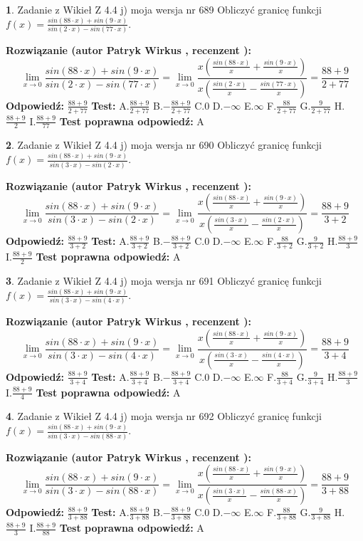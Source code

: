 \documentclass[12pt, a4paper]{article}
\theoremstyle{definition} %
\newtheorem{zad}{}
\newcommand{\zadStart}[1]{\begin{zad}#1\newline}
\newcommand{\zadStop}{\end{zad}}
\newcommand{\rozwStart}[2]{\noindent \textbf{Rozwiązanie (autor #1 , recenzent #2): }\newline}
\newcommand{\rozwStop}{\newline}
\newcommand{\odpStart}{\noindent \textbf{Odpowiedź:}\newline}
\newcommand{\odpStop}{\newline}
\newcommand{\testStart}{\noindent \textbf{Test:}\newline}
\newcommand{\testStop}{\newline}
\newcommand{\kluczStart}{\noindent \textbf{Test poprawna odpowiedź:}\newline}
\newcommand{\kluczStop}{\newline}
\begin{document}
\zadStart{Zadanie z Wikieł Z 4.4 j) moja wersja nr 689}
Obliczyć granicę funkcji $f(x)=\frac{sin(88\cdot x) +sin(9\cdot x)}{sin(2\cdot x) -sin(77\cdot x)}$.
\zadStop
\rozwStart{Patryk Wirkus}{}
$$\lim\limits_{x\to 0}\frac{sin(88\cdot x) +sin(9\cdot x)}{sin(2\cdot x) -sin(77\cdot x)}=\lim\limits_{x\to 0}\frac{x(\frac{sin(88\cdot x)}{x}+\frac{sin(9\cdot x)}{x})}{x(\frac{sin(2\cdot x)}{x}-\frac{sin(77\cdot x)}{x})}=\frac{88+9}{2+77}$$
\rozwStop
\odpStart
$\frac{88+9}{2+77}$
\odpStop
\testStart
A.$\frac{88+9}{2+77}$
B.$-\frac{88+9}{2+77}$
C.$0$
D.$-\infty$
E.$\infty$
F.$\frac{88}{2+77}$
G.$\frac{9}{2+77}$
H.$\frac{88+9}{2}$
I.$\frac{88+9}{77}$
\testStop
\kluczStart
A
\kluczStop



\zadStart{Zadanie z Wikieł Z 4.4 j) moja wersja nr 690}
Obliczyć granicę funkcji $f(x)=\frac{sin(88\cdot x) +sin(9\cdot x)}{sin(3\cdot x) -sin(2\cdot x)}$.
\zadStop
\rozwStart{Patryk Wirkus}{}
$$\lim\limits_{x\to 0}\frac{sin(88\cdot x) +sin(9\cdot x)}{sin(3\cdot x) -sin(2\cdot x)}=\lim\limits_{x\to 0}\frac{x(\frac{sin(88\cdot x)}{x}+\frac{sin(9\cdot x)}{x})}{x(\frac{sin(3\cdot x)}{x}-\frac{sin(2\cdot x)}{x})}=\frac{88+9}{3+2}$$
\rozwStop
\odpStart
$\frac{88+9}{3+2}$
\odpStop
\testStart
A.$\frac{88+9}{3+2}$
B.$-\frac{88+9}{3+2}$
C.$0$
D.$-\infty$
E.$\infty$
F.$\frac{88}{3+2}$
G.$\frac{9}{3+2}$
H.$\frac{88+9}{3}$
I.$\frac{88+9}{2}$
\testStop
\kluczStart
A
\kluczStop



\zadStart{Zadanie z Wikieł Z 4.4 j) moja wersja nr 691}
Obliczyć granicę funkcji $f(x)=\frac{sin(88\cdot x) +sin(9\cdot x)}{sin(3\cdot x) -sin(4\cdot x)}$.
\zadStop
\rozwStart{Patryk Wirkus}{}
$$\lim\limits_{x\to 0}\frac{sin(88\cdot x) +sin(9\cdot x)}{sin(3\cdot x) -sin(4\cdot x)}=\lim\limits_{x\to 0}\frac{x(\frac{sin(88\cdot x)}{x}+\frac{sin(9\cdot x)}{x})}{x(\frac{sin(3\cdot x)}{x}-\frac{sin(4\cdot x)}{x})}=\frac{88+9}{3+4}$$
\rozwStop
\odpStart
$\frac{88+9}{3+4}$
\odpStop
\testStart
A.$\frac{88+9}{3+4}$
B.$-\frac{88+9}{3+4}$
C.$0$
D.$-\infty$
E.$\infty$
F.$\frac{88}{3+4}$
G.$\frac{9}{3+4}$
H.$\frac{88+9}{3}$
I.$\frac{88+9}{4}$
\testStop
\kluczStart
A
\kluczStop



\zadStart{Zadanie z Wikieł Z 4.4 j) moja wersja nr 692}
Obliczyć granicę funkcji $f(x)=\frac{sin(88\cdot x) +sin(9\cdot x)}{sin(3\cdot x) -sin(88\cdot x)}$.
\zadStop
\rozwStart{Patryk Wirkus}{}
$$\lim\limits_{x\to 0}\frac{sin(88\cdot x) +sin(9\cdot x)}{sin(3\cdot x) -sin(88\cdot x)}=\lim\limits_{x\to 0}\frac{x(\frac{sin(88\cdot x)}{x}+\frac{sin(9\cdot x)}{x})}{x(\frac{sin(3\cdot x)}{x}-\frac{sin(88\cdot x)}{x})}=\frac{88+9}{3+88}$$
\rozwStop
\odpStart
$\frac{88+9}{3+88}$
\odpStop
\testStart
A.$\frac{88+9}{3+88}$
B.$-\frac{88+9}{3+88}$
C.$0$
D.$-\infty$
E.$\infty$
F.$\frac{88}{3+88}$
G.$\frac{9}{3+88}$
H.$\frac{88+9}{3}$
I.$\frac{88+9}{88}$
\testStop
\kluczStart
A
\kluczStop
\end{document}
